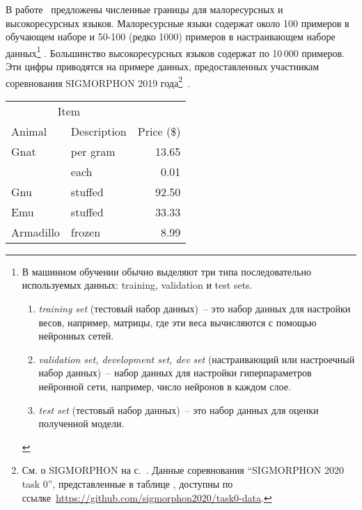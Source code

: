 В работе~\cite{Anastasopoulos2019Pushing_Limits_Low-Resource_MI}
предложены численные границы для малоресурсных и высокоресурсных языков. 
Малоресурсные языки содержат около 100 примеров в обучающем наборе
и 50-100 (редко 1000) примеров в настраивающем наборе данных\footnote{%
    В машинном обучении обычно выделяют три типа
    последовательно используемых данных: training, validation и test sets.
    \begin{enumerate}[label=(\roman*)]
        \item \emph{training set} (тестовый набор данных)~--
            это набор данных для настройки весов, например, матрицы,
            где эти веса вычисляются с помощью нейронных сетей.

        \item \emph{validation set, development set, dev set}
            (настраивающий или настроечный набор данных)~--
            набор данных для настройки гиперпараметров нейронной сети,
            например, число нейронов в каждом слое.

        \item \emph{test set} (тестовый набор данных)~-- это набор данных
            для оценки полученной модели.
    \end{enumerate}
    }%
%
.
Большинство высокоресурсных языков содержат по 10\,000 примеров.
Эти цифры приводятся на примере данных,
предоставленных участникам соревнования SIGMORPHON 2019 года\footnote{%
    См. о SIGMORPHON на с.~\pageref{SIGMORPHON}.
    Данные соревнования ``SIGMORPHON 2020 task 0'', представленные
    в таблице ,
    доступны по
    ссылке~\url{https://github.com/sigmorphon2020/task0-data}.
}~\cite{Anastasopoulos2019Pushing_Limits_Low-Resource_MI}.


\newpage\clearpage


\begin{tabular}{llr}
\hline
\multicolumn{2}{c}{Item} \\
\cline{1-2}
Animal    & Description & Price (\$) \\
\hline
Gnat      & per gram    & 13.65      \\
          & each        & 0.01       \\
Gnu       & stuffed     & 92.50      \\
Emu       & stuffed     & 33.33      \\
Armadillo & frozen      & 8.99       \\
\hline
\end{tabular}






